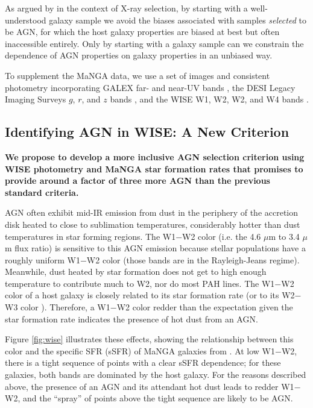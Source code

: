 \documentclass[12pt, preprint]{hacked-aastex}
\begin{document}
As argued by \cite{aird12a} in the context of X-ray selection, by
starting with a well-understood galaxy sample we avoid the biases
associated with samples {\it selected} to be AGN, for which the host
galaxy properties are biased at best but often inaccessible
entirely. Only by starting with a galaxy sample can we constrain the
dependence of AGN properties on galaxy properties in an unbiased way.

To supplement the MaNGA data, we use a set of images and consistent
photometry incorporating GALEX far- and near-UV bands
\cite{martin05a}, the DESI Legacy Imaging Surveys $g$, $r$, and $z$
bands \cite{dey19a}, and the WISE W1, W2, W2, and W4 bands
\cite{wright10a}.

\subsection{Identifying AGN in WISE: A New Criterion}
\label{sec:criterion}

{\bf We propose to develop a more inclusive AGN selection criterion
  using WISE photometry and MaNGA star formation rates that promises
  to provide around a factor of three more AGN than the previous
  standard criteria.}

AGN often exhibit mid-IR emission from dust in the periphery of the
accretion disk heated to close to sublimation temperatures,
considerably hotter than dust temperatures in star forming regions.
The W1$-$W2 color (i.e. the 4.6 $\mu$m to 3.4 $\mu$m flux ratio) is
sensitive to this AGN emission because stellar populations have a
roughly uniform W1$-$W2 color (those bands are in the Rayleigh-Jeans
regime).  Meanwhile, dust heated by star formation does not get to
high enough temperature to contribute much to W2, nor do most PAH
lines.  The W1$-$W2 color of a host galaxy is closely related to its
star formation rate (or to its W2$-$W3 color \cite{hviding22a}).
Therefore, a W1$-$W2 color redder than the expectation given the star
formation rate indicates the presence of hot dust from an AGN.

Figure \ref{fig:wise} illustrates these effects, showing the
relationship between this color and the specific SFR (sSFR) of MaNGA
galaxies from \cite{sanchez22a}.  At low W1$-$W2, there is a tight
sequence of points with a clear sSFR dependence; for these galaxies,
both bands are dominated by the host galaxy.  For the reasons
described above, the presence of an AGN and its attendant hot dust
leads to redder W1$-$W2, and the ``spray'' of points above the tight
sequence are likely to be AGN.
\end{document}
